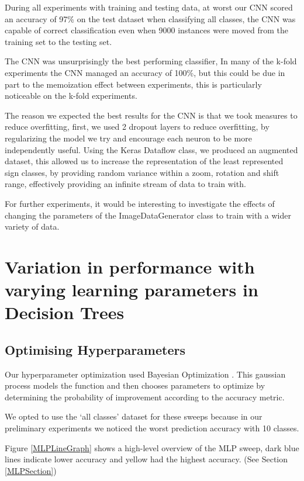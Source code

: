 \documentclass[11pt]{article}
\begin{document}
During all experiments with training and testing data, at worst our CNN scored an accuracy of 97\% on the test dataset when classifying all classes, the CNN was capable of correct classification even when 9000 instances were moved from the training set to the testing set.

The CNN was unsurprisingly the best performing classifier, In many of the k-fold experiments the CNN managed an accuracy of 100\%, but this could be due in part to the memoization effect between experiments, this is particularly noticeable on the k-fold experiments.

The reason we expected the best results for the CNN is that we took measures to reduce overfitting, first, we used 2 dropout layers to reduce overfitting, by regularizing the model we try and encourage each neuron to be more independently useful.
Using the Keras Dataflow class, we produced an augmented dataset, this allowed us to increase the representation of the least represented sign classes, by providing random variance within a zoom, rotation and shift range, effectively providing an infinite stream of data to train with.

For further experiments, it would be interesting to investigate the effects of changing the parameters of the ImageDataGenerator class to train with a wider variety of data.

\newpage
\section{Variation in performance with varying learning parameters in Decision Trees}
\subsection{Optimising Hyperparameters}
\autocite{SklearnTreeDecisionTreeClassifier}

Our hyperparameter optimization used Bayesian Optimization \cite{Configuration}. This gaussian process models the function and then chooses parameters to optimize by determining the probability of improvement according to the accuracy metric. 
\par
We opted to use the ‘all classes’ dataset for these sweeps because in our preliminary experiments we noticed the worst prediction accuracy with 10 classes.

Figure \ref{MLPLineGraph} shows a high-level overview of the MLP sweep, dark blue lines indicate lower accuracy and yellow had the highest accuracy. (See Section \ref{MLPSection})
\end{document}
